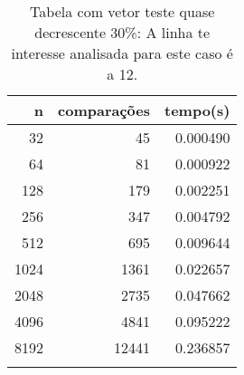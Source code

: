 \begin{table}[ht]
\centering
\begin{tabular}{rrr} \toprule
        n &    comparações &       tempo(s) \\ \midrule
      32  &             45 &      0.000490 \\
      64  &             81 &      0.000922 \\
     128  &            179 &      0.002251 \\
     256  &            347 &      0.004792 \\
     512  &            695 &      0.009644 \\
    1024  &           1361 &      0.022657 \\
    2048  &           2735 &      0.047662 \\
    4096  &           4841 &      0.095222 \\
    8192  &          12441 &      0.236857 \\
\bottomrule\addlinespace
\end{tabular}
\caption{Tabela com vetor teste quase decrescente 30\%: A linha te interesse analisada para este caso é a 12.}
\label{tab:quicksortQuaseDecresc30}
\end{table}
